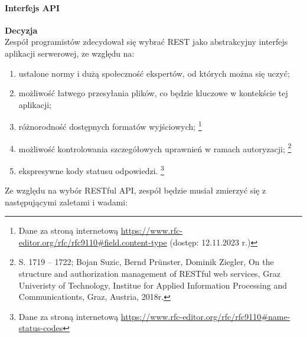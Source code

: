 \documentclass[12pt, a4paper, twoside, openany]{book}
\newcommand{\forceindent}{\leavevmode{\parindent=1.3em\indent}}
\begin{document}
{\paragraph{Interfejs API\\}
\forceindent \textbf{Decyzja}\\
\forceindent Zespół programistów zdecydował się wybrać REST jako abstrakcyjny interfejs aplikacji serwerowej, ze względu na:
\begin{enumerate}[label=--]
    \item ustalone normy i dużą społeczność ekspertów, od których można się uczyć;
    \item możliwość łatwego przesyłania plików, co będzie kluczowe w kontekście tej aplikacji;
    \item różnorodność dostępnych formatów wyjściowych; \footnote{Dane za stroną internetową \url{https://www.rfc-editor.org/rfc/rfc9110#field.content-type} (dostęp: 12.11.2023 r.)}
    \item możliwość kontrolowania szczegółowych uprawnień w ramach autoryzacji; \footnote{S. 1719 -- 1722; Bojan Suzic, Bernd Prünster, Dominik Ziegler, On the structure and authorization management of RESTful web services, Graz Univeristy of Technology, Institue for Applied Information Processing and Communicationts, Graz, Austria, 2018r.}
    \item ekspresywne kody statusu odpowiedzi. \footnote{Dane za stroną internetową \url{https://www.rfc-editor.org/rfc/rfc9110#name-status-codes}}
\end{enumerate}

Ze względu na wybór RESTful API, zespół będzie musiał zmierzyć się z następującymi zaletami i wadami:

}
\end{document}
